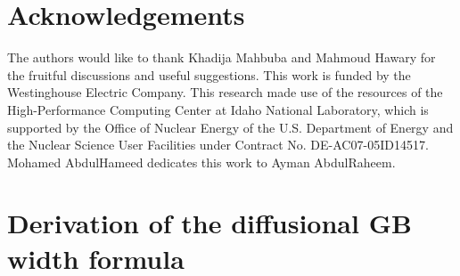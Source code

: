 \documentclass[preprint, 12pt]{elsarticle}
\newcommand{\?}{\stackrel{?}{=}}
\begin{document}

\section{Acknowledgements}

The authors would like to thank Khadija Mahbuba and Mahmoud Hawary for the fruitful discussions and useful suggestions. This work is funded by the Westinghouse Electric Company. This research made use of the resources of the High-Performance Computing Center at Idaho National Laboratory, which is supported by the Office of Nuclear Energy of the U.S. Department of Energy and the Nuclear Science User Facilities under Contract No. DE-AC07-05ID14517. Mohamed AbdulHameed dedicates this work to Ayman AbdulRaheem.

\appendix

\section{Derivation of the diffusional GB width formula}
\label{app}
\end{document}
